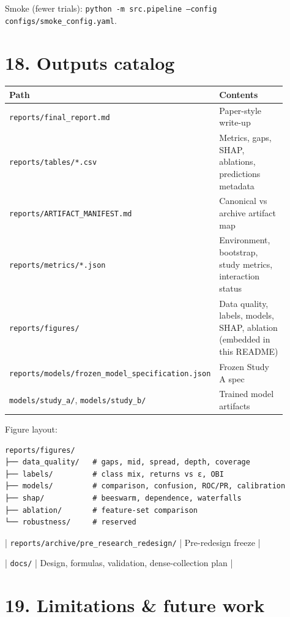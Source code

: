 \documentclass[11pt,a4paper]{article}
\begin{document}
Smoke (fewer trials): \texttt{python -m src.pipeline --config configs/smoke\_config.yaml}.


\vspace{0.5em}

\section{18. Outputs catalog}

\begin{center}
\begin{tabular}{L{0.32\linewidth}L{0.58\linewidth}}
\toprule
Path & Contents \\
\midrule
\texttt{reports/final\_report.md} & Paper-style write-up \\
\texttt{reports/tables/*.csv} & Metrics, gaps, SHAP, ablations, predictions metadata \\
\texttt{reports/ARTIFACT\_MANIFEST.md} & Canonical vs archive artifact map \\
\texttt{reports/metrics/*.json} & Environment, bootstrap, study metrics, interaction status \\
\texttt{reports/figures/} & Data quality, labels, models, SHAP, ablation (embedded in this README) \\
\texttt{reports/models/frozen\_model\_specification.json} & Frozen Study A spec \\
\texttt{models/study\_a/}, \texttt{models/study\_b/} & Trained model artifacts \\
\bottomrule
\end{tabular}
\end{center}
\vspace{0.35em}

Figure layout:


\begin{verbatim}
reports/figures/
├── data_quality/   # gaps, mid, spread, depth, coverage
├── labels/         # class mix, returns vs ε, OBI
├── models/         # comparison, confusion, ROC/PR, calibration
├── shap/           # beeswarm, dependence, waterfalls
├── ablation/       # feature-set comparison
└── robustness/     # reserved
\end{verbatim}
| \texttt{reports/archive/pre\_research\_redesign/} | Pre-redesign freeze |

| \texttt{docs/} | Design, formulas, validation, dense-collection plan |


\vspace{0.5em}

\section{19. Limitations \& future work}
\end{document}
